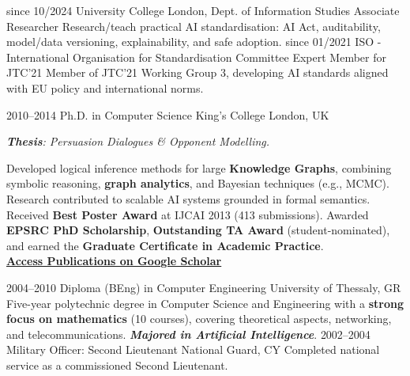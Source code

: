 \documentclass[]{../../../../friggeri-cv}
\begin{document}
\begin{entrylist2}
    \entrytwo
        {\footnotesize since 10/2024}
        {\small University College London, Dept. of Information Studies}
        {\small Associate Researcher}
        {\small Research/teach practical AI standardisation: AI Act, auditability, model/data versioning, explainability, and safe adoption.}
    \entrytwo
        {\footnotesize since 01/2021}
        {\small ISO - International Organisation for Standardisation}
        {\small Committee Expert Member for JTC'21}
        {\footnotesize Member of JTC'21 Working Group 3, developing AI standards aligned with EU policy and international norms.}
\end{entrylist2}
\begin{entrylist2}
    \entrytwo
        {\small 2010--2014}
        {\small Ph.D. in Computer Science}
        {\small King's College London, UK}
        {\small \emph{\textbf{Thesis}: Persuasion Dialogues \& Opponent Modelling.}

        {\footnotesize Developed logical inference methods for large \textbf{Knowledge Graphs}, combining symbolic reasoning, \textbf{graph analytics}, and Bayesian techniques (e.g., MCMC). Research contributed to scalable AI systems grounded in formal semantics. Received \textbf{Best Poster Award} at IJCAI 2013 (413 submissions). Awarded \textbf{EPSRC PhD Scholarship}, \textbf{Outstanding TA Award} (student-nominated), and earned the \textbf{Graduate Certificate in Academic Practice}.
        \\ \textbf{\textcolor{blue}{\href{https://scholar.google.com/citations?hl=en&user=Rr3KTx8AAAAJ}{\underline{Access Publications on Google Scholar}}}}}
        }
    \entrytwo
        {\small  2004--2010}
        {\small Diploma (BEng) in Computer Engineering}
        {\small University of Thessaly, GR}
        {\footnotesize Five-year polytechnic degree in Computer Science and Engineering with a \textbf{strong focus on mathematics} (10 courses), covering theoretical aspects, networking, and telecommunications. \emph{\textbf{Majored in Artificial Intelligence}}.}
    \entrytwo
        {\small  2002--2004}
        {\small Military Officer: Second Lieutenant}
        {\small National Guard, CY}
        {\small Completed national service as a commissioned Second Lieutenant.}
\end{entrylist2}
\end{document}
